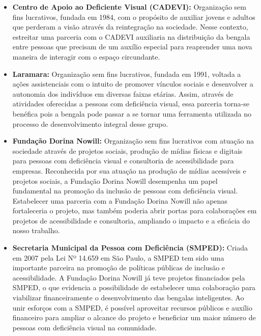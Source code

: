     
    \begin{itemize}
        \item \textbf{Centro de Apoio ao Deficiente Visual (CADEVI):} Organização sem fins lucrativos, fundada em 1984, com o propósito de auxiliar jovens e adultos que perderam a visão através da reintegração na sociedade. Nesse contexto, estreitar uma parceria com o CADEVI auxiliaria na distribuição da bengala entre pessoas que precisam de um auxílio especial para reaprender uma nova maneira de interagir com o espaço circundante.
        
        \item \textbf{Laramara:} Organização sem fins lucrativos, fundada em 1991, voltada a ações assistenciais com o intuito de promover vínculos sociais e desenvolver a autonomia dos indivíduos em diversas faixas etárias. Assim, através de atividades oferecidas a pessoas com deficiência visual, essa parceria torna-se benéfica pois a bengala pode passar a se tornar uma ferramenta utilizada no processo de desenvolvimento integral desse grupo.
        
        \item \textbf{Fundação Dorina Nowill:} Organização sem fins lucrativos com atuação na sociedade através de projetos sociais, produção de mídias físicas e digitais para pessoas com deficiência visual e consultoria de acessibilidade para empresas. Reconhecida por sua atuação na produção de mídias acessíveis e projetos sociais, a Fundação Dorina Nowill desempenha um papel fundamental na promoção da inclusão de pessoas com deficiência visual. Estabelecer uma parceria com a Fundação Dorina Nowill não apenas fortaleceria o projeto, mas também poderia abrir portas para colaborações em projetos de acessibilidade e consultoria, ampliando o impacto e a eficácia do nosso trabalho.
        
        \item \textbf{Secretaria Municipal da Pessoa com Deficiência (SMPED):} Criada em 2007 pela Lei Nº 14.659 em São Paulo, a SMPED tem sido uma importante parceira na promoção de políticas públicas de inclusão e acessibilidade. A Fundação Dorina Nowill já teve projetos financiados pela SMPED, o que evidencia a possibilidade de estabelecer uma colaboração para viabilizar financeiramente o desenvolvimento das bengalas inteligentes. Ao unir esforços com a SMPED, é possível aproveitar recursos públicos e auxílio financeiro para ampliar o alcance do projeto e beneficiar um maior número de pessoas com deficiência visual na comunidade.
    \end{itemize}